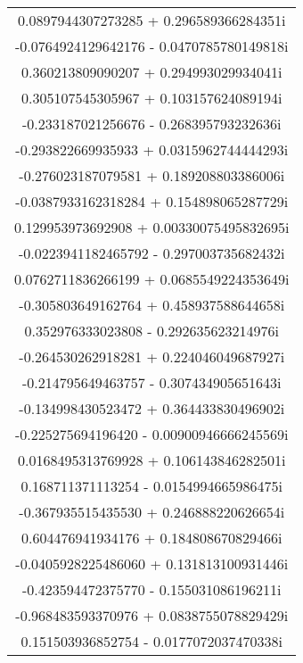 \documentclass[12pt,a4paper,UTF8]{ctexart}
\begin{document}
\begin{enumerate}
\begin{longtable}{c}
              0.0897944307273285     +   0.296589366284351i   \\
              -0.0764924129642176    -   0.0470785780149818i  \\
              0.360213809090207      +   0.294993029934041i   \\
              0.305107545305967      +   0.103157624089194i   \\
              -0.233187021256676     -   0.268395793232636i   \\
              -0.293822669935933     +   0.0315962744444293i  \\
              -0.276023187079581     +   0.189208803386006i   \\
              -0.0387933162318284    +   0.154898065287729i   \\
              0.129953973692908      +   0.00330075495832695i \\
              -0.0223941182465792    -   0.297003735682432i   \\
              0.0762711836266199     +   0.0685549224353649i  \\
              -0.305803649162764     +   0.458937588644658i   \\
              0.352976333023808      -   0.292635623214976i   \\
              -0.264530262918281     +   0.224046049687927i   \\
              -0.214795649463757     -   0.307434905651643i   \\
              -0.134998430523472     +   0.364433830496902i   \\
              -0.225275694196420     -   0.00900946666245569i \\
              0.0168495313769928     +   0.106143846282501i   \\
              0.168711371113254      -   0.0154994665986475i  \\
              -0.367935515435530     +   0.246888220626654i   \\
              0.604476941934176      +   0.184808670829466i   \\
              -0.0405928225486060    +   0.131813100931446i   \\
              -0.423594472375770     -   0.155031086196211i   \\
              -0.968483593370976     +   0.0838755078829429i  \\
              0.151503936852754      -   0.0177072037470338i
          \end{longtable}


\end{enumerate}
\end{document}
